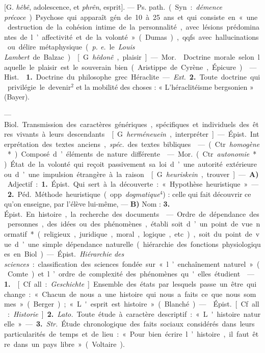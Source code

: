 \begin{itemize}[leftmargin=1cm, label=, itemsep=1pt]
 [G. {\it hêbê}, adolescence, et {\it phrên}, esprit].
— \si{Ps. path.} (Syn. : {\it démence précoce}). Psychose qui apparaît gén.
de 10 à 25 ans et qui consiste en « une destruction de la cohésion intime de
la personnalité, avec lésions prédominantes de l’affectivité et de la
volonté » (Dumas), qqfs. avec hallucinations ou délire métaphysique
({\it p. e.} le {\it Louis Lambert} de Balzac).

 [G. {\it hêdonê}, plaisir]. — \si{Mor.} 
Doctrine morale selon laquelle le plaisir est le souverain bien
(Aristippe de Cyrène, Épicure).

 — \si{Hist.}  {\bf 1.} Doctrine du philosophe grec
Héraclite. — {\it Ext.} {\bf 2.} Toute doctrine qui privilégie le devenir$^2$
et la mobilité des choses : « L’héraclitéisme bergsonien » (Bayer).

 — \si{Biol.} Transmission des caractères génériques,
spécifiques et individuels des êtres vivants à leurs descendants.

 [G. {\it herméneuein}, interpréter]. — \si{Épist.}
Interprétation des textes anciens, {\it spéc.} des textes bibliques.

 — (Ctr. {\it homogène}*).
Composé d’éléments de nature différente.

 — \si{Mor.} (Ctr. {\it autonomie}*). État de la volonté qui
reçoit passivement sa loi d’une autorité extérieure ou d’une impulsion
étrangère à la raison.

 [G. {\it heuriskein}, trouver].
— {\bf A)} Adjectif : {\bf 1.} \si{Épist.} Qui sert à
la découverte : « Hypothèse heuristique ». — {\bf 2.} \si{Péd.} Méthode
heuristique (opp. {\it dogmatique}$^4$) : celle qui fait découvrir ce qu’on
enseigne, par l'élève lui-même, — {\bf B)} Nom : {\bf 3.} \si{Épist.} En histoire,
la recherche des documents.

 — Ordre de dépendance des personnes, des idées ou des
phénomènes, établi soit d’un point de vue normatif* (religieux, juridique,
moral, logique, etc.), soit du point de vue d’une simple dépendance naturelle
(hiérarchie des fonctions physiologiques en Biol.). — \si{Épist.}
{\it Hiérarchie des sciences} : classification des sciences fondée sur
« l’enchaînement naturel » (Comte) et l’ordre de complexité des phénomènes
qu'elles étudient.

 — {\bf 1.}  [Cf. all. : {\it Geschichte}]
Ensemble des états par lesquels passe un être qui change : « Chacun de nous a
une histoire qui nous a faits ce que nous sommes » (Berger) ; « L'esprit est
histoire » (Blanché). —  \si{Épist.} [Cf. all. :
{\it Historie}]. {\bf 2.} {\it Lato.} Toute étude à caractère descriptif :
« L'histoire naturelle ». — {\bf 3.} {\it Str.} Étude chronologique des faits
sociaux considérés dans leurs particularités de temps et de lieu : « Pour
bien écrire l’histoire, il faut être dans un pays libre » (Voltaire).


\end{itemize}
